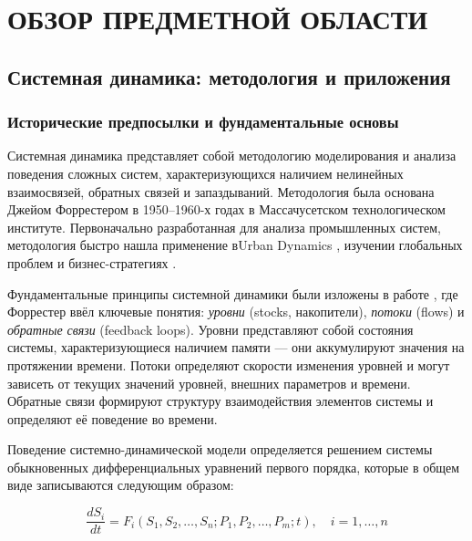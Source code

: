 
\chapter{ОБЗОР ПРЕДМЕТНОЙ ОБЛАСТИ}

\section{Системная динамика: методология и приложения}

\subsection{Исторические предпосылки и фундаментальные основы}

Системная динамика представляет собой методологию моделирования и анализа поведения сложных систем, характеризующихся наличием нелинейных взаимосвязей, обратных связей и запаздываний. Методология была основана Джейом Форрестером в 1950--1960-х годах в Массачусетском технологическом институте. Первоначально разработанная для анализа промышленных систем, методология быстро нашла применение вUrban Dynamics \cite{forrester1969urban}, изучении глобальных проблем \cite{meadows1972limits} и бизнес-стратегиях \cite{sterman2000business}.

Фундаментальные принципы системной динамики были изложены в работе \cite{forrester1961industrial}, где Форрестер ввёл ключевые понятия: \emph{уровни} (stocks, накопители), \emph{потоки} (flows) и \emph{обратные связи} (feedback loops). Уровни представляют собой состояния системы, характеризующиеся наличием памяти --- они аккумулируют значения на протяжении времени. Потоки определяют скорости изменения уровней и могут зависеть от текущих значений уровней, внешних параметров и времени. Обратные связи формируют структуру взаимодействия элементов системы и определяют её поведение во времени.

Поведение системно-динамической модели определяется решением системы обыкновенных дифференциальных уравнений первого порядка, которые в общем виде записываются следующим образом:

\begin{equation}
    \frac{dS_i}{dt} = F_i(S_1, S_2, \ldots, S_n; P_1, P_2, \ldots, P_m; t), \quad i = 1, \ldots, n
    \label{eq:sde_general}
\end{equation}

